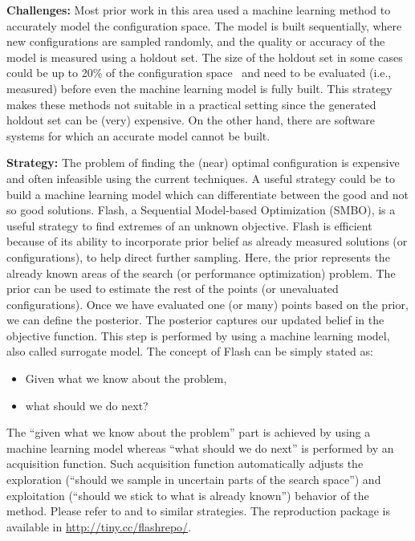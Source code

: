 \documentclass[table, xcdraw, sigconf,review, anonymous]{acmart}
\begin{document}
\noindent\textbf{Challenges: } Most prior work in this area used a machine learning method to accurately model the
configuration space. The model is built sequentially, where new configurations are sampled randomly, and the quality
or accuracy of the model is measured using a holdout set. The size of the holdout set in some cases could be up to 20\% of the configuration space~\cite{nair2017using} and need to be evaluated (i.e., measured) before even the machine learning model is fully built. This strategy makes these methods not suitable in a practical setting since the generated holdout set can be (very) expensive. On the other hand, there are software systems for which an accurate model cannot be built. 

\noindent\textbf{Strategy: } The problem of finding the (near) optimal configuration is expensive and often infeasible using the current techniques. A useful strategy could be to build a machine learning model which can differentiate between the good and not so good solutions. Flash, a Sequential Model-based Optimization (SMBO), is a useful
strategy to find extremes of an unknown objective. Flash is
efficient because of its ability to incorporate prior belief as
already measured solutions (or configurations), to help direct
further sampling. Here, the prior represents the already
known areas of the search (or performance optimization) problem. The prior can be used to estimate the rest of the
points (or unevaluated configurations). Once we have evaluated
one (or many) points based on the prior, we can define
the posterior. The posterior captures our updated belief in
the objective function. This step is performed by using a
machine learning model, also called surrogate model. 
The concept of Flash can be simply stated as:
\begin{itemize}
\item Given what we know about the problem,
\item what should we do next?
\end{itemize}
The ``given what we know about the problem'' part is
achieved by using a machine learning model whereas ``what
should we do next'' is performed by an acquisition function.
Such acquisition function automatically adjusts the exploration
(``should we sample in uncertain parts of the search
space'') and exploitation (``should we stick to what is already
known'') behavior of the method. Please refer to  \cite{nair2018finding} and  \cite{nair2017using,nair2017faster} to similar strategies. The reproduction package is available in \url{http://tiny.cc/flashrepo/}.
\end{document}
